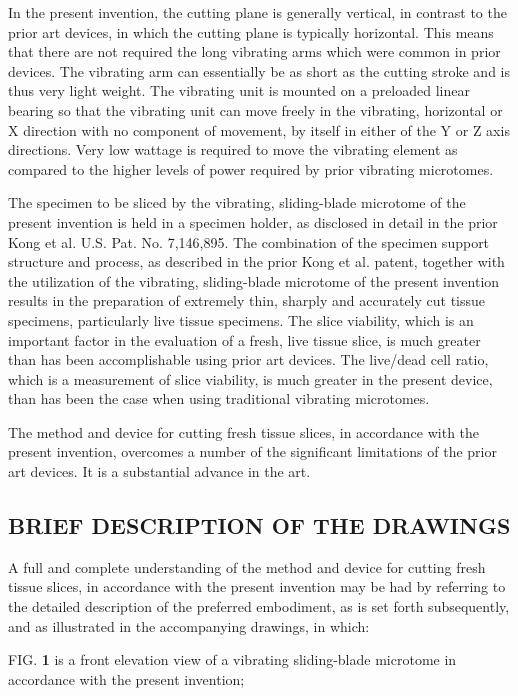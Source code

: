\documentclass{article}
\begin{document}
In the present invention, the cutting plane is generally vertical, in contrast to the prior art devices, in which the cutting plane is typically horizontal. This means that there are not required the long vibrating arms which were common in prior devices. The vibrating arm can essentially be as short as the cutting stroke and is thus very light weight. The vibrating unit is mounted on a preloaded linear bearing so that the vibrating unit can move freely in the vibrating, horizontal or X direction with no component of movement, by itself in either of the Y or Z axis directions. Very low wattage is required to move the vibrating element as compared to the higher levels of power required by prior vibrating microtomes.

The specimen to be sliced by the vibrating, sliding-blade microtome of the present invention is held in a specimen holder, as disclosed in detail in the prior Kong et al. U.S. Pat. No. 7,146,895. The combination of the specimen support structure and process, as described in the prior Kong et al. patent, together with the utilization of the vibrating, sliding-blade microtome of the present invention results in the preparation of extremely thin, sharply and accurately cut tissue specimens, particularly live tissue specimens. The slice viability, which is an important factor in the evaluation of a fresh, live tissue slice, is much greater than has been accomplishable using prior art devices. The live/dead cell ratio, which is a measurement of slice viability, is much greater in the present device, than has been the case when using traditional vibrating microtomes.

The method and device for cutting fresh tissue slices, in accordance with the present invention, overcomes a number of the significant limitations of the prior art devices. It is a substantial advance in the art.

\subsection*{BRIEF DESCRIPTION OF THE DRAWINGS}

A full and complete understanding of the method and device for cutting fresh tissue slices, in accordance with the present invention may be had by referring to the detailed description of the preferred embodiment, as is set forth subsequently, and as illustrated in the accompanying drawings, in which:

FIG. \textbf{1} is a front elevation view of a vibrating sliding-blade microtome in accordance with the present invention;
\end{document}
